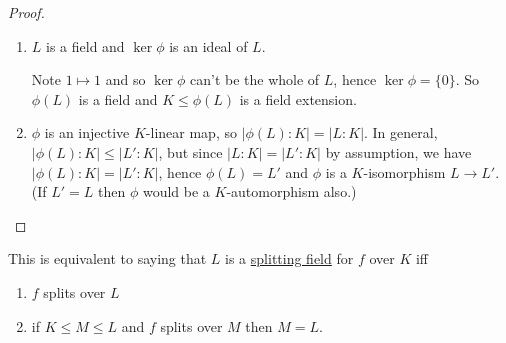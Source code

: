 \documentclass{article}
\begin{document}
\begin{proof} \leavevmode
    \begin{enumerate}[label=(\roman*)]
        \item $L$ is a field and $\ker \phi$ is an ideal of $L$.

            Note $1 \mapsto 1$ and so $\ker \phi$ can't be the whole of $L$, hence $\ker \phi = \{0\}$.
            So $\phi(L)$ is a field and $K \leq \phi(L)$ is a field extension.
        \item $\phi$ is an injective $K$-linear map, so $|\phi(L):K| = |L:K|$.
            In general, $|\phi(L):K| \leq |L':K|$, but since $|L:K| = |L':K|$ by assumption, we have $|\phi(L):K| = |L':K|$, hence $\phi(L) = L'$ and $\phi$ is a $K$-isomorphism $L \to L'$.
            (If $L' = L$ then $\phi$ would be a $K$-automorphism also.) \qedhere
    \end{enumerate}
\end{proof}


\begin{remark}
    This is equivalent to saying that $L$ is a \hyperlink{def:splitting}{splitting field} for $f$ over $K$ iff
    \begin{enumerate}[label=(\roman*)]
        \item $f$ splits over $L$
        \item if $K \leq M \leq L$ and $f$ splits over $M$ then $M=L$.
    \end{enumerate}
\end{remark}
\end{document}
